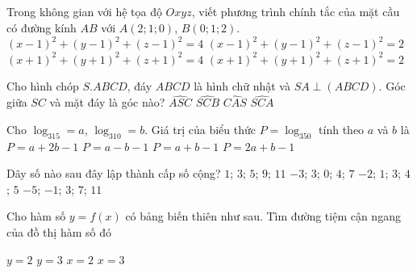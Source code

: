 \begin{ex}%
	Trong không gian với hệ tọa độ $Oxyz$, viết phương trình chính tắc của mặt cầu có đường kính $AB$ với $A(2;1;0)$, $B(0;1;2)$.
	\choice
	{$(x-1)^2+(y-1)^2+(z-1)^2=4$}
	{\True $(x-1)^2+(y-1)^2+(z-1)^2=2$}
	{$(x+1)^2+(y+1)^2+(z+1)^2=4$}
	{$(x+1)^2+(y+1)^2+(z+1)^2=2$}
\end{ex}

\begin{ex}%
	Cho hình chóp $S.ABCD$, đáy $ABCD$ là hình chữ nhật và $SA\perp (ABCD)$. Góc giữa $SC$ và mặt đáy là góc nào?
	\choice
	{$\widehat{ASC}$}
	{$\widehat{SCB}$}
	{$\widehat{CAS}$}
	{\True $\widehat{SCA}$}
\end{ex}

\begin{ex}%
	Cho $\log _315=a$, $\log _310=b$. Giá trị của biểu thức $P=\log _350$ tính theo $a$ và $b$ là
	\choice
	{$P=a+2b-1$}
	{$P=a-b-1$}
	{\True $P=a+b-1$}
	{$P=2a+b-1$}
\end{ex}

\begin{ex}%
	Dãy số nào sau đây lập thành cấp số cộng?
	\choice
	{$1$; $3$; $5$; $9$; $11$}
	{$-3$; $3$; $0$; $4$; $7$}
	{$-2$; $1$; $3$; $4$; $5$}
	{\True $-5$; $-1$; $3$; $7$; $11$}
\end{ex}

\begin{ex}%
	Cho hàm số $y=f(x)$ có bảng biến thiên như sau. Tìm đường tiệm cận ngang của đồ thị hàm số đó
	\begin{center}
	\end{center}
	\choice
	{$y=2$}
	{\True $y=3$}
	{$x=2$}
	{$x=3$}
\end{ex}

